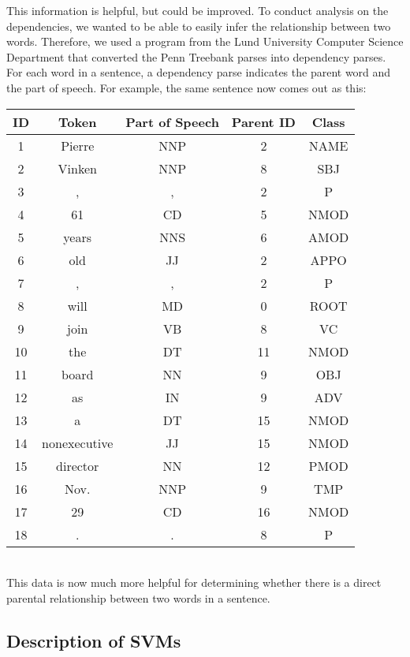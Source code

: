 \documentclass[12pt,fleqn]{article}
\begin{document}
This information is helpful, but could be improved. To conduct analysis on the dependencies, we wanted to be able to easily infer the relationship between two words. Therefore, we used a program from the Lund University Computer Science Department that converted the Penn Treebank parses into dependency parses. For each word in a sentence, a dependency parse indicates the parent word and the part of speech. For example, the same sentence now comes out as this:
\\

        \begin{tabular}{||ccccc|}
            ID & Token & Part of Speech & Parent ID & Class \\ 
            \hline
            1 &Pierre & NNP & 2 & NAME \\
            2 & Vinken & NNP & 8 & SBJ\\
            3 & , & , & 2 & P\\
            4 & 61 & CD & 5 & NMOD\\
            5 & years & NNS & 6 & AMOD\\
            6 & old & JJ & 2 & APPO\\
            7 & , & , & 2 & P\\
            8 & will & MD & 0 & ROOT\\
            9 & join & VB & 8 & VC\\
            10 & the & DT & 11 & NMOD\\
            11 & board & NN & 9 & OBJ\\
            12 & as & IN & 9 & ADV\\
            13 & a & DT & 15 & NMOD\\
            14 & nonexecutive & JJ & 15 & NMOD\\
            15 & director & NN & 12 & PMOD\\
            16 & Nov. & NNP & 9 & TMP\\
            17 & 29 & CD & 16 & NMOD\\
            18 & . & . & 8 & P\\
            \hline
        \end{tabular} \\


This data is now much more helpful for determining whether there is a direct parental relationship between two words in a sentence.

\subsection{Description of SVMs}
\end{document}
